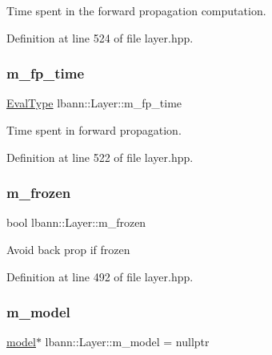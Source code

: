 Time spent in the forward propagation computation. 

Definition at line 524 of file layer.\+hpp.

\mbox{\label{classlbann_1_1Layer_ab1bd9ab0a6f9e554f4dc936d8316028e}} 
\subsubsection{\texorpdfstring{m\+\_\+fp\+\_\+time}{m\_fp\_time}}
{\footnotesize\ttfamily \hyperlink{base_8hpp_a3266f5ac18504bbadea983c109566867}{Eval\+Type} lbann\+::\+Layer\+::m\+\_\+fp\+\_\+time\hspace{0.3cm}{\ttfamily [protected]}}

Time spent in forward propagation. 

Definition at line 522 of file layer.\+hpp.

\mbox{\label{classlbann_1_1Layer_afdc60df9731a3ecdeeeb8175fa483676}} 
\subsubsection{\texorpdfstring{m\+\_\+frozen}{m\_frozen}}
{\footnotesize\ttfamily bool lbann\+::\+Layer\+::m\+\_\+frozen\hspace{0.3cm}{\ttfamily [protected]}}

Avoid back prop if frozen 

Definition at line 492 of file layer.\+hpp.

\mbox{\label{classlbann_1_1Layer_a3d9315e99574166f2f33e37b572021d2}} 
\subsubsection{\texorpdfstring{m\+\_\+model}{m\_model}}
{\footnotesize\ttfamily \hyperlink{classlbann_1_1model}{model}$\ast$ lbann\+::\+Layer\+::m\+\_\+model = nullptr\hspace{0.3cm}{\ttfamily [protected]}}

